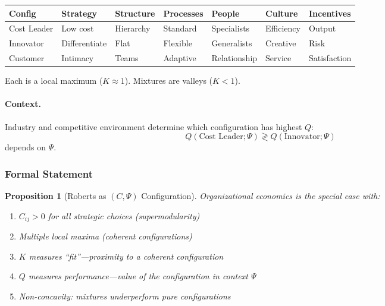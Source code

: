 \documentclass[12pt,a4paper]{article}
\newtheorem{proposition}[theorem]{Proposition}
\begin{document}
\begin{center}
\renewcommand{\arraystretch}{1.2}
\begin{tabular}{lllllll}
\hline
\textbf{Config} & \textbf{Strategy} & \textbf{Structure} & \textbf{Processes} & \textbf{People} & \textbf{Culture} & \textbf{Incentives} \\
\hline
Cost Leader & Low cost & Hierarchy & Standard & Specialists & Efficiency & Output \\
Innovator & Differentiate & Flat & Flexible & Generalists & Creative & Risk \\
Customer & Intimacy & Teams & Adaptive & Relationship & Service & Satisfaction \\
\hline
\end{tabular}
\end{center}

Each is a local maximum ($K \approx 1$). Mixtures are valleys ($K < 1$).

\paragraph{Context.}
Industry and competitive environment determine which configuration has highest $Q$:
\begin{equation}
  Q(\text{Cost Leader}; \Psi) \gtrless Q(\text{Innovator}; \Psi)
\end{equation}
depends on $\Psi$.

\subsubsection{Formal Statement}

\begin{proposition}[Roberts as $(C, \Psi)$ Configuration]
Organizational economics is the special case with:
\begin{enumerate}
  \item $C_{ij} > 0$ for all strategic choices (supermodularity)
  \item Multiple local maxima (coherent configurations)
  \item $K$ measures ``fit''---proximity to a coherent configuration
  \item $Q$ measures performance---value of the configuration in context $\Psi$
  \item Non-concavity: mixtures underperform pure configurations
\end{enumerate}
\end{proposition}
\end{document}
